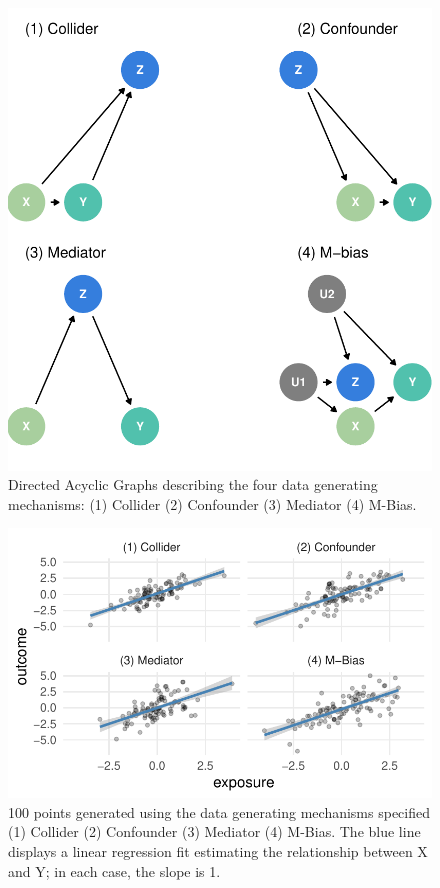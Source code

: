 \documentclass[
  letterpaper,
  DIV=11,
  numbers=noendperiod]{scrartcl}
\begin{document}
\begin{figure}

{\centering \includegraphics{manuscript_files/figure-pdf/fig-1-1.pdf}

}

\caption{\label{fig-1}Directed Acyclic Graphs describing the four data
generating mechanisms: (1) Collider (2) Confounder (3) Mediator (4)
M-Bias.}

\end{figure}

\begin{figure}

{\centering \includegraphics{manuscript_files/figure-pdf/fig-2-1.pdf}

}

\caption{\label{fig-2}100 points generated using the data generating
mechanisms specified (1) Collider (2) Confounder (3) Mediator (4)
M-Bias. The blue line displays a linear regression fit estimating the
relationship between X and Y; in each case, the slope is 1.}

\end{figure}
\end{document}
